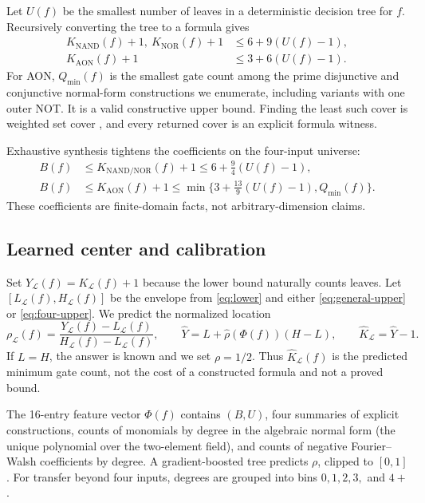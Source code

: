 \documentclass[10pt]{article}
\newcommand{\AON}{\mathrm{AON}}
\newcommand{\Khat}{\widehat K_{\mathcal L}}
\begin{document}
Let $U(f)$ be the smallest number of leaves in a deterministic decision tree
for $f$.  Recursively converting the tree to a formula gives
\begin{align}
 K_{\mathrm{NAND}}(f)+1,\ K_{\mathrm{NOR}}(f)+1
   &\le 6+9(U(f)-1),\nonumber\\
 K_{\AON}(f)+1&\le 3+6(U(f)-1).
 \label{eq:general-upper}
\end{align}
For AON, $Q_{\min}(f)$ is the smallest gate count among the prime disjunctive
and conjunctive normal-form constructions we enumerate, including variants
with one outer NOT.  It is a valid constructive upper bound.  Finding the
least such cover is weighted set cover \cite{allender2006}, and every returned
cover is an explicit formula witness.

Exhaustive synthesis tightens the coefficients on the four-input universe:
\begin{align}
 B(f)&\le K_{\mathrm{NAND/NOR}}(f)+1
       \le 6+\tfrac94(U(f)-1),\nonumber\\
 B(f)&\le K_{\AON}(f)+1
       \le\min\{3+\tfrac{13}{9}(U(f)-1),Q_{\min}(f)\}.
 \label{eq:four-upper}
\end{align}
These coefficients are finite-domain facts, not arbitrary-dimension claims.

\subsection{Learned center and calibration}

Set $Y_{\mathcal L}(f)=K_{\mathcal L}(f)+1$ because the lower bound naturally
counts leaves.  Let $[L_{\mathcal L}(f),H_{\mathcal L}(f)]$ be the envelope
from \eqref{eq:lower} and either \eqref{eq:general-upper} or
\eqref{eq:four-upper}.  We predict the normalized location
\begin{equation}
 \rho_{\mathcal L}(f)=\frac{Y_{\mathcal L}(f)-L_{\mathcal L}(f)}
 {H_{\mathcal L}(f)-L_{\mathcal L}(f)},
 \qquad
 \widehat Y=L+\widehat\rho(\Phi(f))(H-L),
 \qquad \Khat=\widehat Y-1.
 \label{eq:center}
\end{equation}
If $L=H$, the answer is known and we set $\rho=1/2$.  Thus $\Khat(f)$ is the
predicted minimum gate count, not the cost of a constructed formula and not a
proved bound.

The 16-entry feature vector $\Phi(f)$ contains $(B,U)$, four summaries of
explicit constructions, counts of monomials by degree in the algebraic normal
form (the unique polynomial over the two-element field), and counts of
negative Fourier--Walsh coefficients by degree.  A gradient-boosted tree
predicts $\rho$, clipped to $[0,1]$.  For transfer beyond four inputs, degrees
are grouped into bins $0,1,2,3,$ and $4+$.
\end{document}
